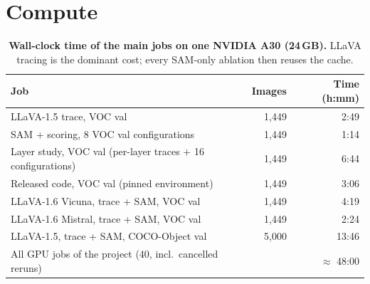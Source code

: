 \documentclass{article}
\begin{document}
\section{Compute}
\label{app:compute}
\begin{table}[h]
  \centering
  \caption{\textbf{Wall-clock time of the main jobs on one NVIDIA A30 (24\,GB).} LLaVA tracing is the
  dominant cost; every SAM-only ablation then reuses the cache.}
  \label{tab:compute}
  \small
  \begin{tabular}{@{}lrr@{}}
    \toprule
    \textbf{Job} & \textbf{Images} & \textbf{Time (h:mm)}\\
    \midrule
    LLaVA-1.5 trace, VOC val & 1,449 & 2:49\\
    SAM + scoring, 8 VOC val configurations & 1,449 & 1:14\\
    Layer study, VOC val (per-layer traces + 16 configurations) & 1,449 & 6:44\\
    Released code, VOC val (pinned environment) & 1,449 & 3:06\\
    LLaVA-1.6 Vicuna, trace + SAM, VOC val & 1,449 & 4:19\\
    LLaVA-1.6 Mistral, trace + SAM, VOC val & 1,449 & 2:24\\
    LLaVA-1.5, trace + SAM, COCO-Object val & 5,000 & 13:46\\
    \midrule
    \rowcolor{white}
    All GPU jobs of the project (40, incl.\ cancelled reruns) & & $\approx$ 48:00\\
    \bottomrule
  \end{tabular}
\end{table}
\end{document}
